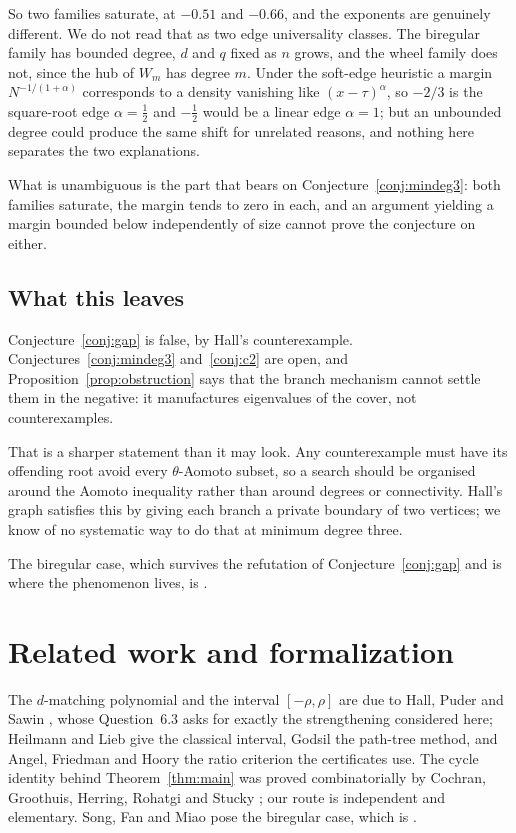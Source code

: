 \documentclass[11pt]{article}
\theoremstyle{remark}
\begin{document}
So two families saturate, at $-0.51$ and $-0.66$, and the exponents are genuinely different. We do
not read that as two edge universality classes. The biregular family has bounded degree, $d$ and $q$
fixed as $n$ grows, and the wheel family does not, since the hub of $W_m$ has degree $m$. Under the
soft-edge heuristic a margin $N^{-1/(1+\alpha)}$ corresponds to a density vanishing like
$(x-\tau)^\alpha$, so $-2/3$ is the square-root edge $\alpha=\tfrac12$ and $-\tfrac12$ would be a
linear edge $\alpha=1$; but an unbounded degree could produce the same shift for unrelated reasons,
and nothing here separates the two explanations.

What is unambiguous is the part that bears on Conjecture~\ref{conj:mindeg3}: both families saturate,
the margin tends to zero in each, and an argument yielding a margin bounded below independently of
size cannot prove the conjecture on either.

\subsection{What this leaves}\label{sec:leaves}

Conjecture~\ref{conj:gap} is false, by Hall's counterexample. Conjectures~\ref{conj:mindeg3}
and~\ref{conj:c2} are open, and Proposition~\ref{prop:obstruction} says that the branch mechanism
cannot settle them in the negative: it manufactures eigenvalues of the cover, not counterexamples.

That is a sharper statement than it may look. Any counterexample must have its offending root avoid
every $\theta$-Aomoto subset, so a search should be organised around the Aomoto inequality rather
than around degrees or connectivity. Hall's graph satisfies this by giving each branch a private
boundary of two vertices; we know of no systematic way to do that at minimum degree three.

The biregular case, which survives the refutation of Conjecture~\ref{conj:gap} and is where the
phenomenon lives, is \cite{PartII}.

\section{Related work and formalization}

The $d$-matching polynomial and the interval $[-\rho,\rho]$ are due to Hall, Puder and Sawin
\cite{HPS}, whose Question~6.3 asks for exactly the strengthening considered here; Heilmann and
Lieb \cite{HL} give the classical interval, Godsil \cite{God81,God93} the path-tree method, and
Angel, Friedman and Hoory \cite{AFH} the ratio criterion the certificates use. The cycle identity
behind Theorem~\ref{thm:main} was proved combinatorially by Cochran, Groothuis, Herring, Rohatgi
and Stucky \cite{CGHRS}; our route is independent and elementary. Song, Fan and Miao \cite{SFM}
pose the biregular case, which is \cite{PartII}.
\end{document}
